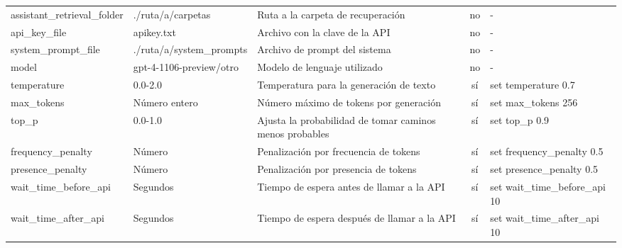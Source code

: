 \begin{landscape}
\begin{table}[htbp]
\begin{tabularx}{\linewidth}{lXlcl}
        assistant\_retrieval\_folder & \textcolor{pathcolor}{./ruta/a/carpetas} & Ruta a la carpeta de recuperación & no & - \\
        api\_key\_file & \textcolor{pathcolor}{apikey.txt} & Archivo con la clave de la API & no & - \\
        system\_prompt\_file & \textcolor{pathcolor}{./ruta/a/system\_prompts} & Archivo de prompt del sistema & no & - \\
        model & gpt-4-1106-preview/otro & Modelo de lenguaje utilizado & no & - \\
        temperature & \textcolor{numbercolor}{0.0-2.0} & Temperatura para la generación de texto & sí & set temperature \textcolor{numbercolor}{0.7} \\
        max\_tokens & \textcolor{numbercolor}{Número entero} & Número máximo de tokens por generación & sí & set max\_tokens \textcolor{numbercolor}{256} \\
        top\_p & \textcolor{numbercolor}{0.0-1.0} & Ajusta la probabilidad de tomar caminos menos probables & sí & set top\_p \textcolor{numbercolor}{0.9} \\
        frequency\_penalty & \textcolor{numbercolor}{Número} & Penalización por frecuencia de tokens & sí & set frequency\_penalty \textcolor{numbercolor}{0.5} \\
        presence\_penalty & \textcolor{numbercolor}{Número} & Penalización por presencia de tokens & sí & set presence\_penalty \textcolor{numbercolor}{0.5} \\
        wait\_time\_before\_api & \textcolor{numbercolor}{Segundos} & Tiempo de espera antes de llamar a la API & sí & set wait\_time\_before\_api \textcolor{numbercolor}{10} \\
        wait\_time\_after\_api & \textcolor{numbercolor}{Segundos} & Tiempo de espera después de llamar a la API & sí & set wait\_time\_after\_api \textcolor{numbercolor}{10} \\
        \bottomrule
    \end{tabularx}
    \endgroup
    \source{\propio}
    \label{table:json_comandos}
    \end{table}
\end{landscape}
    


